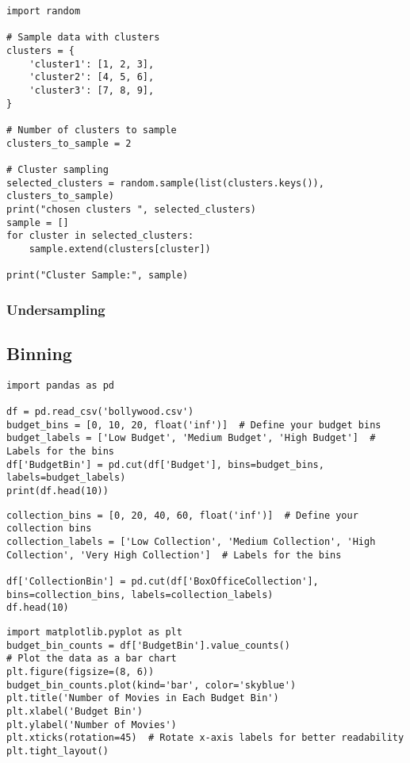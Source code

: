 \documentclass[11pt]{article}
\begin{document}
\begin{verbatim}
import random

# Sample data with clusters
clusters = {
    'cluster1': [1, 2, 3],
    'cluster2': [4, 5, 6],
    'cluster3': [7, 8, 9],
}

# Number of clusters to sample
clusters_to_sample = 2

# Cluster sampling
selected_clusters = random.sample(list(clusters.keys()), clusters_to_sample)
print("chosen clusters ", selected_clusters)
sample = []
for cluster in selected_clusters:
    sample.extend(clusters[cluster])

print("Cluster Sample:", sample)
\end{verbatim}
\subsubsection{Undersampling}
\label{sec:org4824022}
\subsection{Binning}
\label{sec:org598d173}
\begin{verbatim}
import pandas as pd

df = pd.read_csv('bollywood.csv')
budget_bins = [0, 10, 20, float('inf')]  # Define your budget bins
budget_labels = ['Low Budget', 'Medium Budget', 'High Budget']  # Labels for the bins
df['BudgetBin'] = pd.cut(df['Budget'], bins=budget_bins, labels=budget_labels)
print(df.head(10))
\end{verbatim}

\begin{verbatim}
collection_bins = [0, 20, 40, 60, float('inf')]  # Define your collection bins
collection_labels = ['Low Collection', 'Medium Collection', 'High Collection', 'Very High Collection']  # Labels for the bins

df['CollectionBin'] = pd.cut(df['BoxOfficeCollection'], bins=collection_bins, labels=collection_labels)
df.head(10)
\end{verbatim}

\begin{verbatim}
import matplotlib.pyplot as plt
budget_bin_counts = df['BudgetBin'].value_counts()
# Plot the data as a bar chart
plt.figure(figsize=(8, 6))
budget_bin_counts.plot(kind='bar', color='skyblue')
plt.title('Number of Movies in Each Budget Bin')
plt.xlabel('Budget Bin')
plt.ylabel('Number of Movies')
plt.xticks(rotation=45)  # Rotate x-axis labels for better readability
plt.tight_layout()
\end{verbatim}
\end{document}
